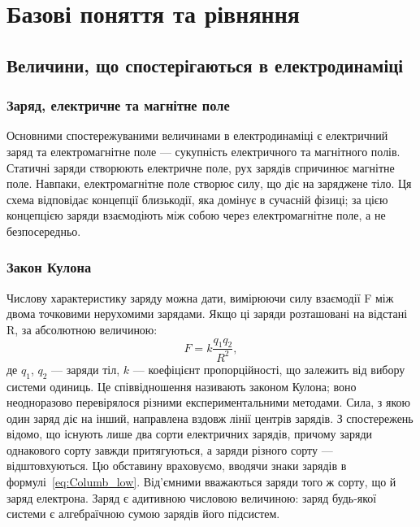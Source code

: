 
\chapter{Базові поняття та рівняння}\label{\currfilebase}

\section{Величини, що спостерігаються в електродинаміці}

\subsection*{Заряд, електричне та магнітне поле}


Основними спостережуваними величинами в електродинаміці є
електричний заряд та електромагнітне поле --- сукупність електричного та
магнітного полів. Статичні заряди створюють електричне поле, рух зарядів
спричинює магнітне поле. Навпаки, електромагнітне поле створює силу, що діє
на заряджене тіло. Ця схема відповідає концепції близькодії, яка домінує в
сучасній фізиці; за цією концепцією заряди взаємодіють між собою через
електромагнітне поле, а не безпосередньо.

\subsection*{Закон Кулона}

Числову характеристику заряду можна дати, вимірюючи
силу взаємодії F між двома точковими нерухомими зарядами. Якщо ці заряди
розташовані на відстані R, за абсолютною величиною:
\begin{equation}\label{eq:Columb_low}
	F = k \frac{q_1q_2}{R^2},
\end{equation}
де $q_1$, $q_2$ --- заряди тіл, $k$ --- коефіцієнт пропорційності, що залежить від вибору
системи одиниць. Це співвідношення називають законом Кулона; воно
неодноразово перевірялося різними експериментальними методами. Сила, з
якою один заряд діє на інший, направлена вздовж лінії центрів зарядів.
З спостережень відомо, що існують лише два сорти електричних зарядів,
причому заряди однакового сорту завжди притягуються, а заряди різного сорту
— відштовхуються. Цю обставину враховуємо, вводячи знаки зарядів в
формулі~\eqref{eq:Columb_low}. Від'ємними вважаються заряди того ж сорту, що й заряд
електрона. Заряд є адитивною числовою величиною: заряд будь-якої
системи є алгебраїчною сумою зарядів його підсистем.

